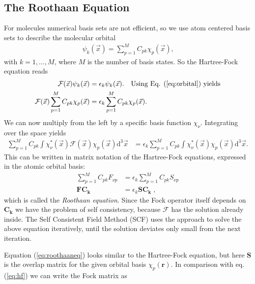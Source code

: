 \documentclass[10pt,a4paper]{article} %
\begin{document}
    \subsection{The Roothaan Equation}
    For molecules numerical basis sets are not efficient, so we use atom centered basis sets to describe the molecular orbital
    \begin{align}\label{eq:orbital}
    \psi_k(\vec{x}) = \sum_{p=1}^M C_{pk} \chi_p (\vec{x})\text{,}
    \end{align}
    with $k = 1,\dots, M$, where $M$ is the number of basis states.
    So the Hartree-Fock equation reads
    \begin{align*}
    \mathcal{F} (\vec{x})   \psi_k(\vec{x}) &= \epsilon_k    \psi_k(\vec{x})\text{.} \quad \text{Using Eq. (\ref{eq:orbital}) yields}\\
    \mathcal{F} (\vec{x})  \sum_{p=1}^M C_{pk} \chi_p (\vec{x}) &= \epsilon_k \sum_{p=1}^M C_{pk} \chi_p (\vec{x})\text{.}\\
    \end{align*}
    We can now multiply from the left by a specific basis function $\chi_\nu$. Integrating over the space yields
    \begin{align*}
     \sum_{p=1}^M C_{pk} \int \chi_\nu^*(\vec{x})  \mathcal{F} (\vec{x}) \chi_p(\vec{x})\text{d}^3 \vec{x} & =  \epsilon_k  \sum_{p=1}^M C_{pk} \int \chi_\nu^*(\vec{x}) \chi_p(\vec{x})\text{d}^3 \vec{x}   \text{.}
    \end{align*}
    This can be written in matrix notation of the Hartree-Fock equations, expressed in the atomic orbital basis:
    \begin{align}\label{eq:roothaaneq}
    \sum_{p=1}^M C_{pk} F_{\nu p}  &= \epsilon_k \sum_{p=1}^M C_{pk} S_{\nu p}\nonumber\\
    \mathbf{F} \mathbf{C_k} &= \epsilon_k \mathbf{S} \mathbf{C_k} \; \text{,}
    \end{align} which is called the \textit{Roothaan equation}.
    Since the Fock operator itself depends on $\mathbf{C_k}$ we have the problem of self consistency, because $\mathcal{F}$ has the solution already inside. The Self Consistent Field Method (SCF) uses the approach to solve the above equation iteratively, until the solution deviates only small from the next iteration.
\par Equation (\ref{eq:roothaaneq}) looks similar to the Hartree-Fock equation, but here $\mathbf{S}$ is the overlap matrix for the given orbital basis $\chi_p (\mathbf{r})$. In comparison with eq. (\ref{eq:hf}) we can write the Fock matrix as \cite{Thijssen2007}
\end{document}

